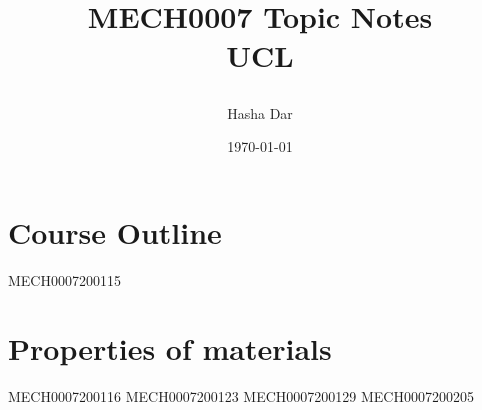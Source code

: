 \documentclass[12pt,a4paper, twoside]{report}
\begin{document}
\title{
  {MECH0007 Topic Notes}\\
  {\large UCL}
  \author{Hasha Dar}
  \date{\today}
}
\maketitle

\tableofcontents
\chapter{Course Outline}
{MECH0007200115}

\chapter{Properties of materials}
{MECH0007200116}
{MECH0007200123}
{MECH0007200129}
{MECH0007200205}

\end{document}
